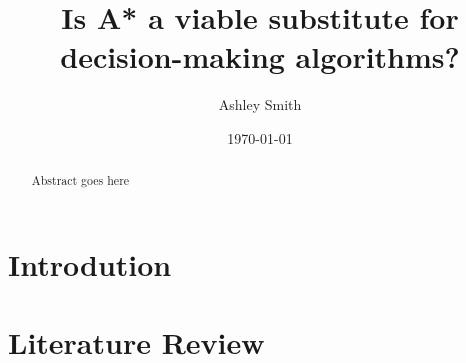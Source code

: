 \documentclass{article}
\begin{document}
\title{Is A* a viable substitute for decision-making algorithms?}
\author{Ashley Smith}
\date{\today}
\maketitle

\begin{abstract}
Abstract goes here
\end{abstract}

\clearpage

\section{Introdution}

\section{Literature Review}

\clearpage
\printbibliography
\end{document}

